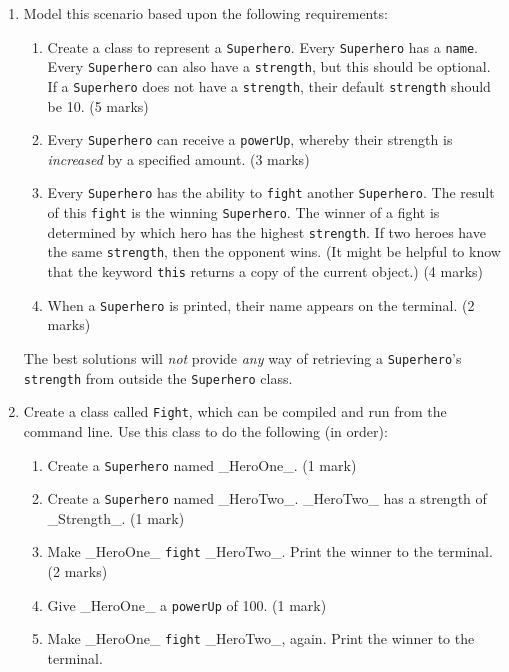 \documentclass[11pt]{article}
\begin{document}
\begin{enumerate}
	
\item Model this scenario based upon the following requirements:

\begin{enumerate}

	\item Create a class to represent a \texttt{Superhero}. Every \texttt{Superhero} has a \texttt{name}. Every \texttt{Superhero} can also have a \texttt{strength}, but this should be optional. If a \texttt{Superhero} does not have a \texttt{strength}, their default \texttt{strength} should be 10. (5 marks)
	
	\item Every \texttt{Superhero} can receive a \texttt{powerUp}, whereby their strength is \emph{increased} by a specified amount. (3 marks)
	
	\item Every \texttt{Superhero} has the ability to \texttt{fight} another \texttt{Superhero}. The result of this \texttt{fight} is the winning \texttt{Superhero}. The winner of a fight is determined by which hero has the highest \texttt{strength}. If two heroes have the same \texttt{strength}, then the opponent wins. (It might be helpful to know that the keyword \texttt{this} returns a copy of the current object.) (4 marks)
	
	\item When a \texttt{Superhero} is printed, their name appears on the terminal. (2 marks)

\end{enumerate}

The best solutions will \emph{not} provide \emph{any} way of retrieving a \texttt{Superhero}'s \texttt{strength} from outside the \texttt{Superhero} class.

\item Create a class called \texttt{Fight}, which can be compiled and run from the command line. Use this class to do the following (in order):

\begin{enumerate}

	\item Create a \texttt{Superhero} named \_HeroOne\_. (1 mark)
	
	\item Create a \texttt{Superhero} named \_HeroTwo\_. \_HeroTwo\_ has a strength of \_Strength\_. (1 mark)
	
	\item Make \_HeroOne\_ \texttt{fight} \_HeroTwo\_. Print the winner to the terminal. (2 marks)
	
	\item Give \_HeroOne\_ a \texttt{powerUp} of 100. (1 mark)
	
	\item Make \_HeroOne\_ \texttt{fight} \_HeroTwo\_, again. Print the winner to the terminal.

\end{enumerate}

\end{enumerate}
\end{document}
